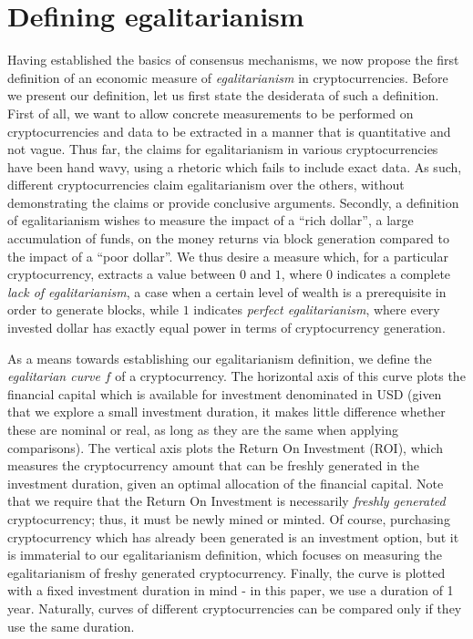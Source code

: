 
\section{Defining egalitarianism}\label{sec:definition}

Having established the basics of consensus mechanisms, we now propose the first
definition of an economic measure of \emph{egalitarianism} in cryptocurrencies.
Before we present our definition, let us first state the desiderata of such a
definition. First of all, we want to allow concrete measurements to be
performed on cryptocurrencies and data to be extracted in a manner that is
quantitative and not vague. Thus far, the claims for egalitarianism in various
cryptocurrencies have been hand wavy, using a rhetoric which fails to include
exact data. As such, different cryptocurrencies claim egalitarianism over the
others, without demonstrating the claims or provide conclusive arguments.
Secondly, a definition of egalitarianism wishes to measure the impact of a
``rich dollar'', \ie a large accumulation of funds, on the money returns via
block generation compared to the impact of a ``poor dollar''.  We thus desire a
measure which, for a particular cryptocurrency, extracts a value between $0$
and $1$, where $0$ indicates a complete \emph{lack of egalitarianism}, \ie a
case when a certain level of wealth is a prerequisite in order to generate
blocks, while $1$ indicates \emph{perfect egalitarianism}, where every invested
dollar has exactly equal power in terms of cryptocurrency generation.

As a means towards establishing our egalitarianism definition, we define the
\emph{egalitarian curve} $f$ of a cryptocurrency. The horizontal axis of this
curve plots the financial capital which is available for investment denominated
in USD (given that we explore
a small investment duration, it makes little difference whether these are
nominal or real, as long as they are the same when applying comparisons).  The
vertical axis plots the Return On Investment (ROI), which measures the
cryptocurrency amount that can be freshly generated in the investment duration,
given an optimal allocation of the financial capital. Note that we require that
the Return On Investment is necessarily \emph{freshly generated}
cryptocurrency; thus, it must be newly mined or minted. Of course, purchasing
cryptocurrency which has already been generated is an investment option, but it
is immaterial to our egalitarianism definition, which focuses on measuring the
egalitarianism of freshy generated cryptocurrency.  Finally, the curve is
plotted with a fixed investment duration in mind - in this paper, we use a
duration of 1 year.  Naturally, curves of different cryptocurrencies can be
compared only if they use the same duration.

